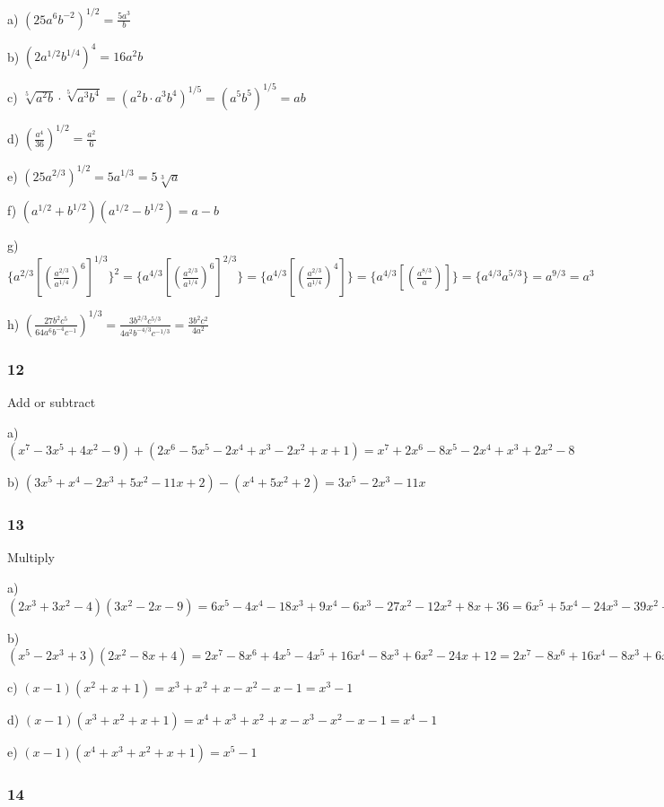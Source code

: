 \documentclass[]{report}
\begin{document}
a) $(25a^6b^{-2})^{1/2} = \frac{5a^3}{b}$


b) $(2a^{1/2}b^{1/4})^4 = 16a^2b$

c) $\sqrt[5]{a^2b} \cdot \sqrt[5]{a^3b^4} = (a^2b \cdot a^3b^4)^{1/5} = (a^5b^5)^{1/5} = ab$

d) $(\frac{a^4}{36})^{1/2} = \frac{a^2}{6}$

e) $(25a^{2/3})^{1/2} = 5a^{1/3} = 5\sqrt[3]{a}$

f) $(a^{1/2} + b^{1/2})(a^{1/2} - b^{1/2}) = a - b$

g) $\{a^{2/3} [(\frac{a^{2/3}}{a^{1/4}})^6]^{1/3}\}^2 = \{a^{4/3} [(\frac{a^{2/3}}{a^{1/4}})^6]^{2/3}\} = \{a^{4/3} [(\frac{a^{2/3}}{a^{1/4}})^4]\} = \{a^{4/3} [(\frac{a^{8/3}}{a})]\} =  \{a^{4/3} a^{5/3}\} = a^{9/3} = a^3$

h) $(\frac{27b^2c^5}{64a^6b^{-4}c^{-1}})^{1/3} =  \frac{3b^{2/3}c^{5/3}}{4a^2b^{-4/3}c^{-1/3}} = \frac{3b^2c^2}{4a^2}$



\subsubsection{12}

Add or subtract


a) $(x^7 - 3x^5 + 4x^2 - 9) + (2x^6 - 5x^5 - 2x^4 + x^3 - 2x^2 + x + 1) = x^7 + 2x^6 - 8x^5 - 2x^4 + x^3 + 2x^2 - 8$

b) $(3x^5 + x^4 - 2x^3 + 5x^2 - 11x + 2) - (x^4 + 5x^2 + 2) = 3x^5 - 2x^3 - 11x$


\subsubsection{13}
Multiply

a) $(2x^3 + 3x^2 - 4)(3x^2 - 2x - 9) = 6x^5 - 4x^4 - 18x^3 + 9x^4 - 6x^3 - 27x^2 - 12x^2 + 8x + 36 = 6x^5 + 5x^4 - 24x^3 - 39x^2 + 8x + 36$

b) $(x^5 - 2x^3 + 3)(2x^2 - 8x + 4) = 2x^7 - 8x^6 + 4x^5 - 4x^5 + 16x^4 - 8x^3 + 6x^2 - 24x + 12 =  2x^7 - 8x^6 + 16x^4 - 8x^3 + 6x^2 - 24x + 12$

c) $(x-1)(x^2 + x + 1) = x^3 + x^2 + x - x^2 - x - 1 = x^3 - 1$

d) $(x-1)(x^3 + x^2 + x + 1) = x^4 + x^3 + x^2 + x - x^3 - x^2 - x - 1 = x^4 -1$

e) $(x-1)(x^4+x^3+x^2+x+1) = x^5 - 1$

\subsubsection{14}
\end{document}
